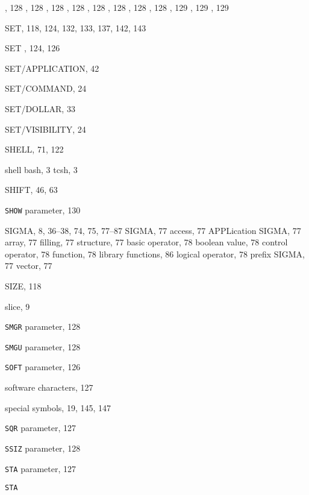 \begin{theindex}
    , 128
    , 128
    , 128
    , 128
    , 128
    , 128
    , 128
    , 128
    , 129
    , 129
    , 129
  \item {\ttfamily  SET}, 118, 124, 132, 133, 137, 142, 143
  \item {\ttfamily  SET }, 124, 126
  \item {\ttfamily  SET/APPLICATION}, 42
  \item {\ttfamily  SET/COMMAND}, 24
  \item {\ttfamily  SET/DOLLAR}, 33
  \item {\ttfamily  SET/VISIBILITY}, 24
  \item {\ttfamily  SHELL}, 71, 122
  \item shell
    \subitem bash, 3
    \subitem tcsh, 3
  \item {\ttfamily  SHIFT}, 46, 63
  \item {\tt SHOW}
     parameter, 130
  \item SIGMA, 8, 36--38, 74, 75, 77--87
    \subitem \protect\dollar SIGMA, 77
    \subitem access, 77
    \subitem APPLication SIGMA, 77
    \subitem array, 77
      \subsubitem filling, 77
      \subsubitem structure, 77
    \subitem basic operator, 78
    \subitem boolean value, 78
    \subitem control operator, 78
    \subitem function, 78
    \subitem library functions, 86
    \subitem logical operator, 78
    \subitem prefix SIGMA, 77
    \subitem vector, 77
  \item {\ttfamily  SIZE}, 118
  \item slice, 9
  \item {\tt SMGR}
     parameter, 128
  \item {\tt SMGU}
     parameter, 128
  \item {\tt SOFT}
     parameter, 126
  \item software
    \subitem characters, 127
  \item special symbols, 19, 145, 147
  \item {\tt SQR}
     parameter, 127
  \item {\tt SSIZ}
     parameter, 128
  \item {\tt STA}
     parameter, 127
  \item {\tt STA }

\end{theindex}
